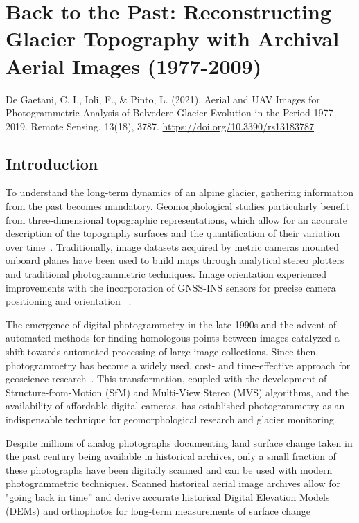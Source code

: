 \graphicspath{{figures/chapter2/}}
\onehalfspacing

\chapter{Back to the Past: Reconstructing Glacier Topography with Archival Aerial Images
  (1977-2009)}\label{ch:2}
  
\vfill


\noindent De Gaetani, C. I., Ioli, F., \& Pinto, L. (2021). Aerial and UAV Images for
Photogrammetric Analysis of Belvedere Glacier Evolution in the Period 1977–2019. Remote
Sensing, 13(18), 3787. \url{https://doi.org/10.3390/rs13183787}

\newpage

\section{Introduction}\label{sec:2:introduction}

To understand the long-term dynamics of an alpine glacier, gathering information from the past becomes mandatory. 
Geomorphological studies particularly benefit from three-dimensional topographic representations, which allow for an accurate description of the topography surfaces and the quantification of their variation over time~\citep{chandler1995steady}.
Traditionally, image datasets acquired by metric cameras mounted onboard planes have been used to build maps through analytical stereo plotters and traditional photogrammetric techniques. 
Image orientation experienced improvements with the incorporation of GNSS-INS sensors for precise camera positioning and orientation
~\citep{Forlani_pinto2001, jacobsen2004issues}.

The emergence of digital photogrammetry in the late 1990s and the advent of automated methods for finding homologous points between images catalyzed a shift towards automated processing of large image collections. 
Since then, photogrammetry has become a widely used, cost- and time-effective approach for geoscience research~\citep{Lane2000}.
This transformation, coupled with the development of Structure-from-Motion (SfM) and Multi-View Stereo (MVS) algorithms, and the availability of affordable digital cameras, has established photogrammetry as an indispensable technique for geomorphological research and glacier monitoring.

Despite millions of analog photographs documenting land surface change taken in the past century being available in historical archives, only a small fraction of these photographs have been digitally scanned and can be used with modern photogrammetric techniques. 
Scanned historical aerial image archives allow for "going back in time” and derive accurate historical Digital Elevation Models (DEMs) and orthophotos for long-term measurements of surface change ~\citep{Micheletti2015}

